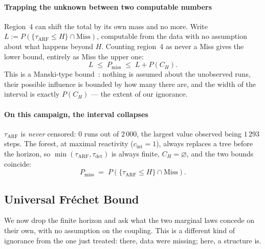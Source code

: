 \documentclass[10pt,conference]{IEEEtran}
\theoremstyle{definition}
\begin{document}
\paragraph{Trapping the unknown between two computable numbers} Region~4 can shift the
total by its own mass and no more. Write
$L := P(\{\tau_{\mathrm{ARF}} \le H\} \cap \mathrm{Miss})$, computable from the data with
no assumption about what happens beyond $H$. Counting region~4 as never a Miss gives the
lower bound, entirely as Miss the upper one:
\[
  L \;\le\; P_{\mathrm{miss}} \;\le\; L + P(C_H).
\]
This is a Manski-type bound~\cite{manski2003}: nothing is assumed about the unobserved
runs, their possible influence is bounded by how many there are, and the width of the interval is exactly
$P(C_H)$ --- the extent of our ignorance.

\paragraph{On this campaign, the interval collapses} $\tau_{\mathrm{ARF}}$ is
\emph{never} censored: $0$ runs out of $2\,000$, the largest value observed being
$1\,293$ steps. The forest, at maximal reactivity ($c_{\mathrm{int}} = 1$), always
replaces a tree before the horizon, so $\min(\tau_{\mathrm{ARF}},\tau_{\mathrm{det}})$
is always finite, $C_H = \varnothing$, and the two bounds coincide:
\[
  P_{\mathrm{miss}} \;=\; P(\{\tau_{\mathrm{ARF}} \le H\} \cap \mathrm{Miss}).
\]

\begin{center}
\end{center}

\subsection{Universal Fréchet Bound}

We now drop the finite horizon and ask what the two marginal laws concede on their own,
with no assumption on the coupling. This is a different kind of ignorance from the one
just treated: there, data were missing; here, a structure is.
\end{document}
